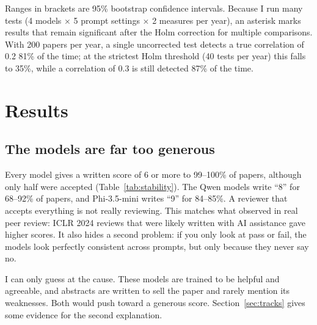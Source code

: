 \documentclass[11pt]{article}
\begin{document}
Ranges in brackets are 95\% bootstrap confidence intervals. Because I run many tests (4 models $\times$ 5 prompt settings $\times$ 2 measures per year), an asterisk marks results that remain significant after the Holm correction for multiple comparisons. With 200 papers per year, a single uncorrected test detects a true correlation of 0.2 81\% of the time; at the strictest Holm threshold (40 tests per year) this falls to 35\%, while a correlation of 0.3 is still detected 87\% of the time.

\section{Results}

\begin{table}[!htbp]
\centering
\small

\caption{Leniency and consistency across the four prompts (200 papers per year, half truly accepted). ``Prompts agree'' is the mean Spearman correlation between the rankings of two prompts. ``Verdict flips'' is the share of papers accepted under one prompt and rejected under another when each prompt accepts its top half. ``Score shift'' is the gap between the most and least generous prompt's average expected score. Brackets: 95\% confidence intervals.}
\label{tab:stability}
\end{table}

\subsection{The models are far too generous}
\label{sec:leniency}
Every model gives a written score of 6 or more to 99--100\% of papers, although only half were accepted (Table~\ref{tab:stability}). The Qwen models write ``8'' for 68--92\% of papers, and Phi-3.5-mini writes ``9'' for 84--85\%. A reviewer that accepts everything is not really reviewing. This matches what \citet{latona2024lottery} observed in real peer review: ICLR 2024 reviews that were likely written with AI assistance gave higher scores. It also hides a second problem: if you only look at pass or fail, the models look perfectly consistent across prompts, but only because they never say no.

I can only guess at the cause. These models are trained to be helpful and agreeable, and abstracts are written to sell the paper and rarely mention its weaknesses. Both would push toward a generous score. Section~\ref{sec:tracks} gives some evidence for the second explanation.
\end{document}
